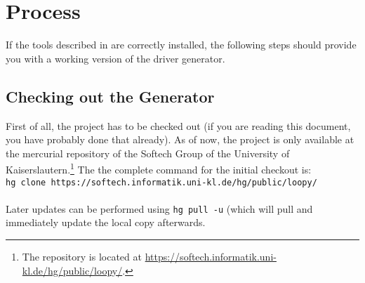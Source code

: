\documentclass{report}
\begin{document}
\section{Process}
\label{sec:process}
If the tools described in  are correctly installed, the following steps should provide you with a working version of the driver generator.


\subsection{Checking out the Generator}
First of all, the project has to be checked out (if you are reading this document, you have probably done that already). As of now, the project is only available at the mercurial repository of the Softech Group of the University of Kaiserslautern.\footnote{The repository is located at \url{https://softech.informatik.uni-kl.de/hg/public/loopy/}.} The the complete command for the initial checkout is:\\

\texttt{hg clone https://softech.informatik.uni-kl.de/hg/public/loopy/\\<target dir>}\\

Later updates can be performed using \texttt{hg pull -u} (which will pull and immediately update the local copy afterwards.
%
%
%
%
%
%
%
\end{document}
